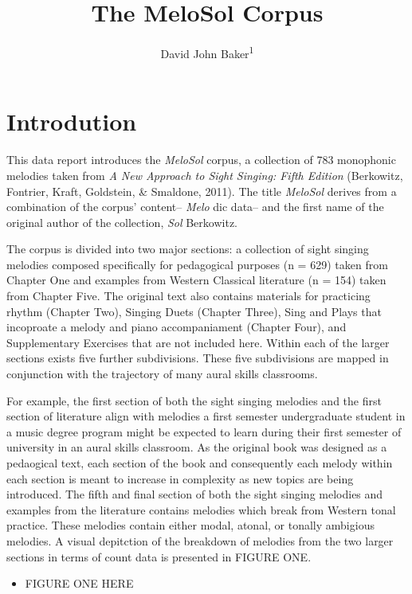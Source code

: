 \documentclass[english,man]{apa6}
\author{David John Baker\textsuperscript{1}}
\affiliation{
\vspace{0.5cm}
\textsuperscript{1} Louisiana State University}
\title{The MeloSol Corpus}
\date{}
\providecommand{\tightlist}{%
  \setlength{\itemsep}{0pt}\setlength{\parskip}{0pt}}
\begin{document}
\maketitle

\hypertarget{introdution}{%
\section{Introdution}\label{introdution}}

This data report introduces the \emph{MeloSol} corpus, a collection of 783 monophonic melodies taken from \emph{A New Approach to Sight Singing: Fifth Edition} (Berkowitz, Fontrier, Kraft, Goldstein, \& Smaldone, 2011).
The title \emph{MeloSol} derives from a combination of the corpus' content-- \emph{Melo} dic data-- and the first name of the original author of the collection, \emph{Sol} Berkowitz.

The corpus is divided into two major sections: a collection of sight singing melodies composed specifically for pedagogical purposes (n = 629) taken from Chapter One and examples from Western Classical literature (n = 154) taken from Chapter Five.
The original text also contains materials for practicing rhythm (Chapter Two), Singing Duets (Chapter Three), Sing and Plays that incoproate a melody and piano accompaniament (Chapter Four), and Supplementary Exercises that are not included here.
Within each of the larger sections exists five further subdivisions.
These five subdivisions are mapped in conjunction with the trajectory of many aural skills classrooms.

For example, the first section of both the sight singing melodies and the first section of literature align with melodies a first semester undergraduate student in a music degree program might be expected to learn during their first semester of university in an aural skills classroom.
As the original book was designed as a pedaogical text, each section of the book and consequently each melody within each section is meant to increase in complexity as new topics are being introduced.
The fifth and final section of both the sight singing melodies and examples from the literature contains melodies which break from Western tonal practice.
These melodies contain either modal, atonal, or tonally ambigious melodies.
A visual depitction of the breakdown of melodies from the two larger sections in terms of count data is presented in FIGURE ONE.

\begin{itemize}
\tightlist
\item
  FIGURE ONE HERE
\end{itemize}
\end{document}
